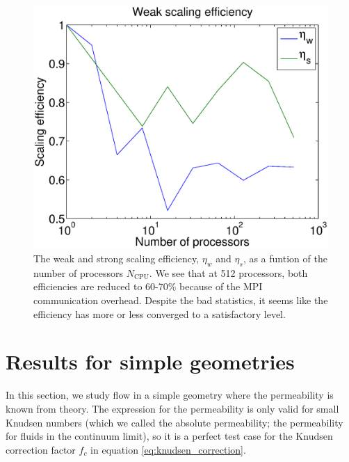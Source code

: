 \begin{figure}[h]
\begin{center}
\includegraphics[width=\textwidth, trim=0cm 0cm 0cm 0cm, clip]{DSMC/figures/scaling.eps}
\end{center}
\caption{The weak and strong scaling efficiency, $\eta_w$ and $\eta_s$, as a funtion of the number of processors $N_\text{CPU}$. We see that at 512 processors, both efficiencies are reduced to 60-70\% because of the MPI communication overhead. Despite the bad statistics, it seems like the efficiency has more or less converged to a satisfactory level.}
\label{fig:dsmc_scaling}
\end{figure}

\section{Results for simple geometries}
\label{sec:results_for_simple_geometries}
In this section, we study flow in a simple geometry where the permeability is known from theory. The expression for the permeability is only valid for small Knudsen numbers (which we called the absolute permeability; the permeability for fluids in the continuum limit), so it is a perfect test case for the Knudsen correction factor $f_c$ in equation \eqref{eq:knudsen_correction}. 
